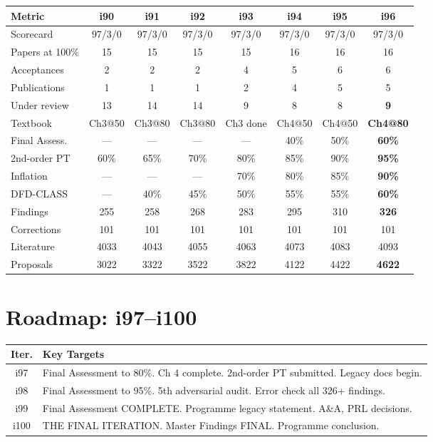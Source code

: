 \documentclass[11pt,a4paper]{article}
\begin{document}
\begin{center}
\begin{tabular}{lccccccc}
\toprule
\textbf{Metric} & \textbf{i90} & \textbf{i91} & \textbf{i92} & \textbf{i93} & \textbf{i94} & \textbf{i95} & \textbf{i96} \\
\midrule
Scorecard & 97/3/0 & 97/3/0 & 97/3/0 & 97/3/0 & 97/3/0 & 97/3/0 & 97/3/0 \\
Papers at 100\% & 15 & 15 & 15 & 15 & 16 & 16 & 16 \\
Acceptances & 2 & 2 & 2 & 4 & 5 & 6 & 6 \\
Publications & 1 & 1 & 1 & 2 & 4 & 5 & 5 \\
Under review & 13 & 14 & 14 & 9 & 8 & 8 & \textbf{9} \\
Textbook & Ch3@50 & Ch3@80 & Ch3@80 & Ch3 done & Ch4@50 & Ch4@50 & \textbf{Ch4@80} \\
Final Assess. & --- & --- & --- & --- & 40\% & 50\% & \textbf{60\%} \\
2nd-order PT & 60\% & 65\% & 70\% & 80\% & 85\% & 90\% & \textbf{95\%} \\
Inflation & --- & --- & --- & 70\% & 80\% & 85\% & \textbf{90\%} \\
DFD-CLASS & --- & 40\% & 45\% & 50\% & 55\% & 55\% & \textbf{60\%} \\
Findings & 255 & 258 & 268 & 283 & 295 & 310 & \textbf{326} \\
Corrections & 101 & 101 & 101 & 101 & 101 & 101 & 101 \\
Literature & 4033 & 4043 & 4055 & 4063 & 4073 & 4083 & 4093 \\
Proposals & 3022 & 3322 & 3522 & 3822 & 4122 & 4422 & \textbf{4622} \\
\bottomrule
\end{tabular}
\end{center}

\section{Roadmap: i97--i100}

\begin{tcolorbox}[colback=blue!5!white, colframe=dfdblue, title=\textbf{THE FINAL FOUR}]
\begin{center}
\begin{tabular}{cl}
\toprule
\textbf{Iter.} & \textbf{Key Targets} \\
\midrule
i97 & Final Assessment to 80\%. Ch 4 complete. 2nd-order PT submitted. Legacy docs begin. \\
i98 & Final Assessment to 95\%. 5th adversarial audit. Error check all 326+ findings. \\
i99 & Final Assessment COMPLETE. Programme legacy statement. A\&A, PRL decisions. \\
i100 & THE FINAL ITERATION. Master Findings FINAL. Programme conclusion. \\
\bottomrule
\end{tabular}
\end{center}
\end{tcolorbox}
\end{document}
